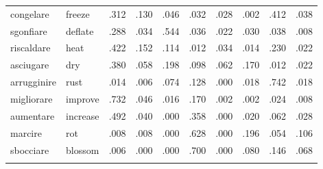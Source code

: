 \documentclass[output=paper,colorlinks,citecolor=brown
]{langscibook}
\begin{document}
\begin{table}[H]
{\begin{tabular}{ll *8{S[table-format=1.3]}}
congelare    & freeze   & .312     & .130  & .046                        & .032                                   & .028                                     & .002                  & .412                & .038  \\
sgonfiare    & deflate  & .288     & .034   & .544                       & .036                                   & .022                                     & .030                  & .038                 & .008  \\
riscaldare   & heat     & .422     & .152  & .114                       & .012                                   & .034                                     & .014                  & .230                & .022  \\
asciugare    & dry      & .380     & .058   & .198                       & .098                                   & .062                                     & .170                 & .012                 & .022  \\
arrugginire  & rust     & .014      & .006   & .074                        & .128                                  & .000                                     & .018                  & .742                & .018  \\
migliorare   & improve  & .732     & .046   & .016                        & .170                                  & .002                                     & .002                  & .024                 & .008  \\
aumentare    & increase & .492     & .040   & .000                        & .358                                  & .000                                     & .020                  & .062                 & .028  \\
marcire      & rot      & .008      & .008   & .000                        & .628                                  & .000                                     & .196                 & .054                 & .106 \\
sbocciare    & blossom  & .006      & .000   & .000                        & .700                                  & .000                                     & .080                  & .146                & .068  \\
\lspbottomrule
\end{tabular}}
\end{table}
 
 
\printbibliography[heading=subbibliography,notkeyword=this]
\end{document}
